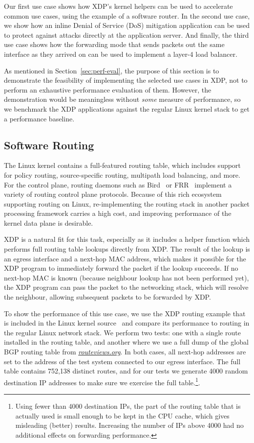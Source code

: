 \documentclass[sigconf]{acmart}
\begin{document}
Our first use case shows how XDP's kernel helpers can be used to accelerate
common use cases, using the example of a software router. In the second use
case, we show how an inline Denial of Service (DoS) mitigation application can
be used to protect against attacks directly at the application server. And
finally, the third use case shows how the forwarding mode that sends packets out
the same interface as they arrived on can be used to implement a layer-4 load
balancer.

As mentioned in Section~\ref{sec:perf-eval}, the purpose of this section is to
demonstrate the feasibility of implementing the selected use cases in XDP, not
to perform an exhaustive performance evaluation of them. However, the
demonstration would be meaningless without \emph{some} measure of performance,
so we benchmark the XDP applications against the regular Linux kernel stack to
get a performance baseline.

\subsection{Software Routing}
\label{sec:fwd-usecase}
The Linux kernel contains a full-featured routing table, which includes support
for policy routing, source-specific routing, multipath load balancing, and more.
For the control plane, routing daemons such as Bird~\cite{bird} or
FRR~\cite{frr} implement a variety of routing control plane protocols. Because
of this rich ecosystem supporting routing on Linux, re-implementing the routing
stack in another packet processing framework carries a high cost, and improving
performance of the kernel data plane is desirable.

XDP is a natural fit for this task, especially as it includes a helper function
which performs full routing table lookups directly from XDP. The result of the
lookup is an egress interface and a next-hop MAC address, which makes it
possible for the XDP program to immediately forward the packet if the lookup
succeeds. If no next-hop MAC is known (because neighbour lookup has not been
performed yet), the XDP program can pass the packet to the networking stack,
which will resolve the neighbour, allowing subsequent packets to be forwarded by
XDP.

To show the performance of this use case, we use the XDP routing example that is
included in the Linux kernel source~\cite{fwd-example} and compare its
performance to routing in the regular Linux network stack. We perform two tests:
one with a single route installed in the routing table, and another where we use
a full dump of the global BGP routing table from \emph{\url{routeviews.org}}. In
both cases, all next-hop addresses are set to the address of the test system
connected to our egress interface. The full table contains 752,138 distinct
routes, and for our tests we generate 4000 random destination IP addresses to
make sure we exercise the full table.\footnote{Using fewer than 4000 destination
  IPs, the part of the routing table that is actually used is small enough to be
  kept in the CPU cache, which gives misleading (better) results. Increasing the
  number of IPs above 4000 had no additional effects on forwarding
  performance.}.
\end{document}
